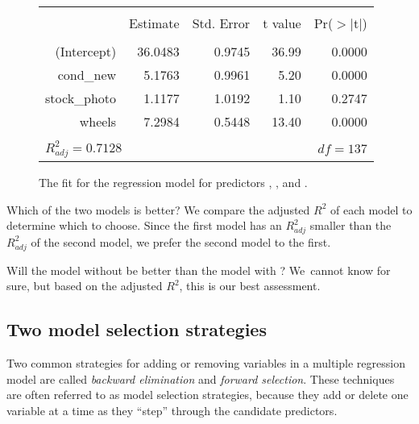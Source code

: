 \begin{figure}[ht]
\centering
\begin{tabular}{rrrrr}
  \hline
  \vspace{-3.7mm} & & & & \\
 & Estimate & Std. Error & t value & Pr($>$$|$t$|$) \\ 
  \hline
  \vspace{-3.8mm} & & & & \\
(Intercept) & 36.0483 & 0.9745 & 36.99 & 0.0000 \\ 
  cond\_\hspace{0.3mm}new & 5.1763 & 0.9961 & 5.20 & 0.0000 \\ 
  stock\_\hspace{0.3mm}photo & 1.1177 & 1.0192 & 1.10 & 0.2747 \\ 
  wheels & 7.2984 & 0.5448 & 13.40 & 0.0000 \\ 
   \hline
  \vspace{-3.6mm} & & & & \\
\multicolumn{3}{l}{$R_{adj}^2 = 0.7128$}&\multicolumn{2}{r}{$df=137$}
\end{tabular}
\caption{The fit for the regression model for predictors , , and .}
\label{marioKartMultipleRegressionModelAllButDuration}
\end{figure}

\begin{examplewrap}
\begin{nexample}{Which of the two models is better?}
We compare the adjusted $R^2$ of each model to determine which to choose. Since the first model has an $R^2_{adj}$ smaller than the $R^2_{adj}$ of the second model, we prefer the second model to the first.
\end{nexample}
\end{examplewrap}

Will the model without  be better than the model with ? We~cannot know for sure, but based on the adjusted $R^2$, this is our best assessment.


\subsection{Two model selection strategies}

Two common strategies for adding or removing variables in a multiple regression model are called \emph{backward elimination} and \emph{forward selection}. These techniques are often referred to as  model selection strategies, because they add or delete one variable at a time as they ``step'' through the candidate predictors.

